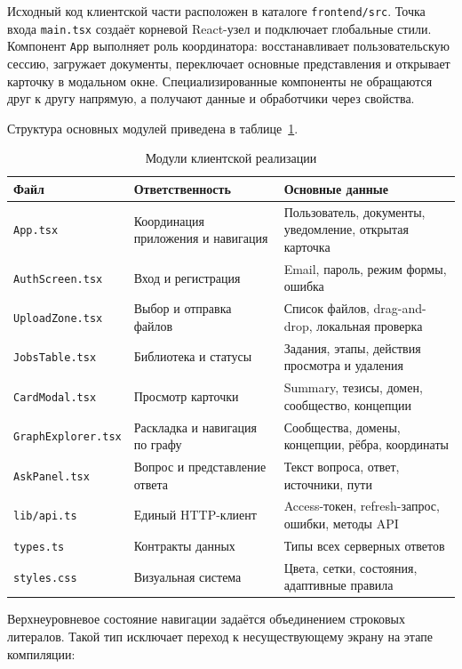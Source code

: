 Исходный код клиентской части расположен в каталоге \texttt{frontend/src}. Точка входа \texttt{main.tsx} создаёт корневой React-узел и подключает глобальные стили. Компонент \texttt{App} выполняет роль координатора: восстанавливает пользовательскую сессию, загружает документы, переключает основные представления и открывает карточку в модальном окне. Специализированные компоненты не обращаются друг к другу напрямую, а получают данные и обработчики через свойства.

Структура основных модулей приведена в таблице~\ref{tab:frontend_modules}.

\begin{table}[h!]
\caption{Модули клиентской реализации}
\label{tab:frontend_modules}
\begin{tabularx}{\textwidth}{|X|X|X|}
\hline
\textbf{Файл} & \textbf{Ответственность} & \textbf{Основные данные} \\
\hline
\texttt{App.tsx} & Координация приложения и навигация & Пользователь, документы, уведомление, открытая карточка \\
\hline
\texttt{AuthScreen.tsx} & Вход и регистрация & Email, пароль, режим формы, ошибка \\
\hline
\texttt{UploadZone.tsx} & Выбор и отправка файлов & Список файлов, drag-and-drop, локальная проверка \\
\hline
\texttt{JobsTable.tsx} & Библиотека и статусы & Задания, этапы, действия просмотра и удаления \\
\hline
\texttt{CardModal.tsx} & Просмотр карточки & Summary, тезисы, домен, сообщество, концепции \\
\hline
\texttt{GraphExplorer.tsx} & Раскладка и навигация по графу & Сообщества, домены, концепции, рёбра, координаты \\
\hline
\texttt{AskPanel.tsx} & Вопрос и представление ответа & Текст вопроса, ответ, источники, пути \\
\hline
\texttt{lib/api.ts} & Единый HTTP-клиент & Access-токен, refresh-запрос, ошибки, методы API \\
\hline
\texttt{types.ts} & Контракты данных & Типы всех серверных ответов \\
\hline
\texttt{styles.css} & Визуальная система & Цвета, сетки, состояния, адаптивные правила \\
\hline
\end{tabularx}
\end{table}

Верхнеуровневое состояние навигации задаётся объединением строковых литералов. Такой тип исключает переход к несуществующему экрану на этапе компиляции:

